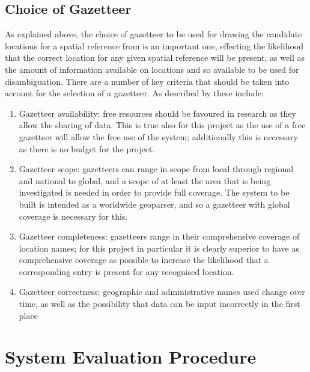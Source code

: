 \documentclass[12pt, a4paper]{report}
\begin{document}
\subsection{Choice of Gazetteer}
\label{subsec_gazetteer}

As explained above, the choice of gazetteer to be used for drawing the candidate locations for a spatial reference from is an important one, effecting the likelihood that the correct location for any given spatial reference will be present, as well as the amount of information available on locations and so available to be used for disambiguation. There are a number of key criteria that should be taken into account for the selection of a gazetteer. As described by \citet{leidner2004} these include:


\begin{enumerate}
	\item { Gazetteer availability: free resources should be favoured in research as they allow the sharing of data. This is true also for this project as the use of a free gazetteer will allow the free use of the system; additionally this is necessary as there is no budget for the project. }
	\item { Gazetteer scope: gazetteers can range in scope from local through regional and national to global, and a scope of at least the area that is being investigated is needed in order to provide full coverage. The system to be built is intended as a worldwide geoparser, and so a gazetteer with global coverage is necessary for this. }
	\item { Gazetteer completeness: gazetteers range in their comprehensive coverage of location names; for this project in particular it is clearly superior to have as comprehensive coverage as possible to increase the likelihood that a corresponding entry is present for any recognised location. }
	\item { Gazetteer correctness: geographic and administrative names used change over time, as well as the possibility that data can be input incorrectly in the first place}
\end{enumerate}




\section{System Evaluation Procedure}
\end{document}
